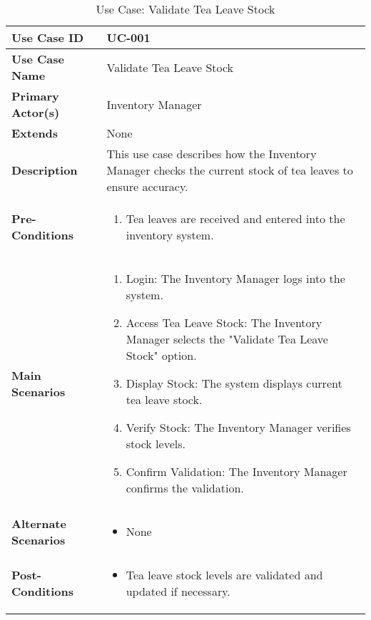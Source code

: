\documentclass{article}
\begin{document}
\begin{table}[!ht]
    \centering
    \renewcommand{\arraystretch}{1.3} %
    \begin{tabularx}{\textwidth}{|l|X|}
        \hline
        \textbf{Use Case ID} & UC-001 \\
        \hline
        \textbf{Use Case Name} & Validate Tea Leave Stock \\
        \hline
        \textbf{Primary Actor(s)} & Inventory Manager \\
        \hline
        \textbf{Extends} & None \\
        \hline
        \textbf{Description} & This use case describes how the Inventory Manager checks the current stock of tea leaves to ensure accuracy. \\
        \hline
        \textbf{Pre-Conditions} & 
        \begin{enumerate}[label=\arabic*.,itemsep=0pt]
            \item Tea leaves are received and entered into the inventory system.
        \end{enumerate} \\
        \hline
        \textbf{Main Scenarios} & 
        \begin{enumerate}[label=\arabic*.,itemsep=0pt]
            \item Login: The Inventory Manager logs into the system.
            \item Access Tea Leave Stock: The Inventory Manager selects the "Validate Tea Leave Stock" option.
            \item Display Stock: The system displays current tea leave stock.
            \item Verify Stock: The Inventory Manager verifies stock levels.
            \item Confirm Validation: The Inventory Manager confirms the validation.
        \end{enumerate} \\
        \hline
        \textbf{Alternate Scenarios} & 
        \begin{itemize}[label=--,itemsep=0pt]
            \item None
        \end{itemize} \\
        \hline
        \textbf{Post-Conditions} & 
        \begin{itemize}[label=--,itemsep=0pt]
            \item Tea leave stock levels are validated and updated if necessary.
        \end{itemize} \\
        \hline
    \end{tabularx}
    \caption{Use Case: Validate Tea Leave Stock}
    \label{tab:use-case-validate-tea-leave-stock}
\end{table}
\end{document}

